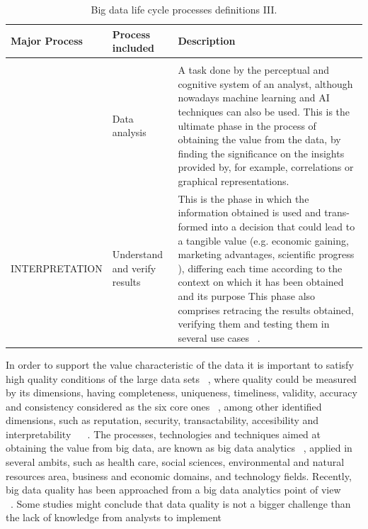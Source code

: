\begin{table}[H]
    \caption{Big data life cycle processes definitions III.}
    \label{table:big_data_life_cyle_processes_definition_III}
    \centering
    \begin{tabular}{p{4.0cm} p{3.1cm} p{7cm}}
    \toprule
    \textbf{Major Process} & \textbf{Process included} & \textbf{Description} \\ 
    \bottomrule   
    & \\ & Data analysis & A task done by the perceptual and
    cognitive system of an analyst, although nowadays machine learning
    and AI techniques can also be used. This is the ultimate phase in the process of obtaining the value from the
    data, by finding the significance on the insights provided by, for example,
    correlations or graphical representations. ~\cite{Ware2012}
    \\
    INTERPRETATION & Understand and verify results & This is the phase in which the information obtained is used and trans-
    formed into a decision that could lead
    to a tangible value (e.g. economic gaining, marketing advantages, scientific progress ), differing each time
    according to the context on which it has been obtained and its purpose This phase also comprises retracing
    the results obtained, verifying them and testing them in several use cases
    ~\cite{ComputingResearchAssociation}.
    \\
    \bottomrule
\end{tabular}
\end{table}

In order to support the value characteristic of the data it is important to satisfy
high quality conditions of the large data sets ~\cite{ZhuCai2015}, where quality could be measured
by its dimensions, having completeness, uniqueness, timeliness, validity, accuracy and
consistency considered as the six core ones ~\cite{DAMA2013}, among other identified dimensions,
such as reputation, security, transactability, accesibility and interpretability ~\cite{Pipino2002} ~\cite{McGilvary2008}.
The processes, technologies and techniques aimed at obtaining the value from big
data, are known as big data analytics ~\cite{Kwon2014}, applied in several ambits, such as health
care, social sciences, environmental and natural resources area, business and economic
domains, and technology fields. Recently, big data quality has been approached from a
big data analytics point of view ~\cite{Kambatla2014} ~\cite{Hazen2014} ~\cite{Lavalle2011}. Some studies might conclude that data
quality is not a bigger challenge than the lack of knowledge from analysts to implement 

